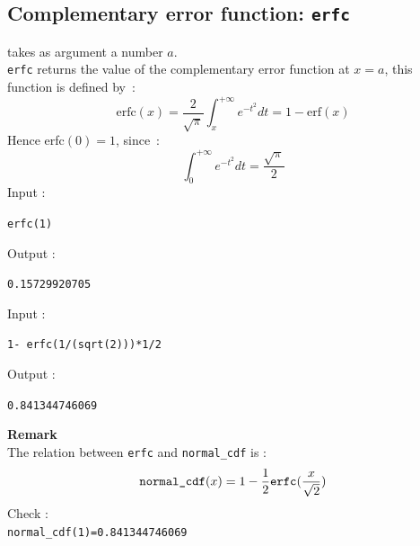 \documentclass[a4paper,11pt]{book}
\begin{document}
\subsection{Complementary error function: {\tt erfc}}
 takes as argument a number $a$.\\
{\tt erfc} returns the value of the complementary error function at
$x=a$, this function is defined by~:
\[
\mbox{erfc}(x)=\frac{2}{\sqrt{\pi}}\int_x^{+\infty}e^{-t^2}dt=1-\mbox{erf}(x)
\]
Hence erfc$(0)=1$, since~:
\[ \int_0^{+\infty}e^{-t^2}dt=\frac{\sqrt{\pi}}{2} \]
Input :
\begin{center}{\tt erfc(1)}\end{center}
Output :
\begin{center}{\tt 0.15729920705}\end{center}
Input :
\begin{center}{\tt 1- erfc(1/(sqrt(2)))*1/2}\end{center}
Output :
\begin{center}{\tt 0.841344746069}\end{center}
{\bf Remark}\\
The relation between {\tt erfc} and {\tt normal\_cdf} is :
\[ \mbox{\tt normal\_cdf}(x)=1-\frac{1}{2}\*\mbox{\tt erfc}
(\frac{x}{\sqrt{2}}) \]
Check :\\
{\tt normal\_cdf(1)=0.841344746069}
\end{document}
